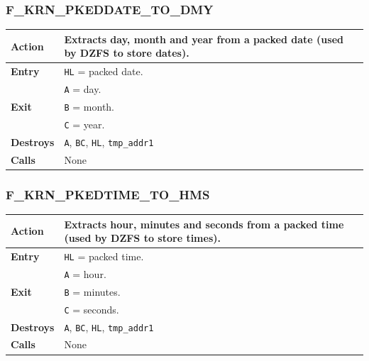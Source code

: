 \documentclass[a4paper,11pt]{article}
\begin{document}
        \subsubsection{F\_KRN\_PKEDDATE\_TO\_DMY}
        \label{func:fkrnpkeddatetodmy}
        \begin{tabular}{l p{9cm}}
            \hline\textbf{Action}
            & Extracts day, month and year from a packed date (used by DZFS to
            store dates).\\
            \hline\textbf{Entry} & \texttt{HL} = packed date.\\
            \hline\multirow[t]{3}{4em}{\textbf{Exit}}
            & \texttt{A} = day.\\
            & \texttt{B} = month.\\
            & \texttt{C} = year.\\
            \hline\textbf{Destroys} & \texttt{A}, \texttt{BC}, \texttt{HL},
            \texttt{tmp\_addr1}\\
            \hline\textbf{Calls} & None\\
            \hline
        \end{tabular}

        \subsubsection{F\_KRN\_PKEDTIME\_TO\_HMS}
        \label{func:fkrnpkedtimetohms}
        \begin{tabular}{l p{9cm}}
            \hline\textbf{Action}
            & Extracts hour, minutes and seconds from a packed time (used by
            DZFS to store times).\\
            \hline\textbf{Entry} & \texttt{HL} = packed time.\\
            \hline\multirow[t]{3}{4em}{\textbf{Exit}}
            & \texttt{A} = hour.\\
            & \texttt{B} = minutes.\\
            & \texttt{C} = seconds.\\
            \hline\textbf{Destroys} & \texttt{A}, \texttt{BC}, \texttt{HL},
            \texttt{tmp\_addr1}\\
            \hline\textbf{Calls} & None\\
            \hline
        \end{tabular}
\end{document}
